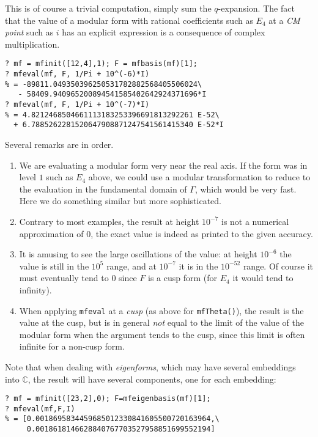 \documentclass[11pt]{article}
\newcommand{\C}{{\mathbb C}}
\newcommand{\G}{\Gamma}
\def\kbd#1{{\tt #1}}
\begin{document}
This is of course a trivial computation, simply sum the $q$-expansion. The
fact that the value of a modular form with rational coefficients such as
$E_4$ at a \emph{CM point} such as $i$ has an explicit expression is a
consequence of complex multiplication.

\begin{verbatim}
? mf = mfinit([12,4],1); F = mfbasis(mf)[1];
? mfeval(mf, F, 1/Pi + 10^(-6)*I)
% = -89811.049350396250531782882568405506024\
   - 58409.940965200894541585402642924371696*I
? mfeval(mf, F, 1/Pi + 10^(-7)*I)
% = 4.8212468504661113183253396691813292261 E-52\
  + 6.7885262281520647908871247541561415340 E-52*I
\end{verbatim}

Several remarks are in order.

\begin{enumerate}
\item We are evaluating a modular form very near the
  real axis. If the form was in level $1$ such as $E_4$ above, we could use a
  modular transformation to reduce to the evaluation in the fundamental domain
  of $\G$, which would be very fast. Here we do something similar but
  more sophisticated.
\item Contrary to most examples, the result at height $10^{-7}$ is not a
  numerical approximation of $0$, the exact value is indeed as printed to
  the given accuracy.
\item It is amusing to see the large oscillations of the value: at height
  $10^{-6}$ the value is still in the $10^5$ range, and at $10^{-7}$ it is
  in the $10^{-52}$ range. Of course it must eventually tend to $0$ since
  $F$ is a cusp form (for $E_4$ it would tend to infinity).
\item When applying \kbd{mfeval} at a \emph{cusp} (as above for
  \kbd{mfTheta()}), the result is
  the value at the cusp, but is in general \emph{not} equal
  to the limit of the value of the modular form when the argument tends to
  the cusp, since this limit is often infinite for a non-cusp form.
\end{enumerate}

Note that when dealing with \emph{eigenforms}, which may have several
embeddings into $\C$, the result will have several components, one for each
embedding:

\begin{verbatim}
? mf = mfinit([23,2],0); F=mfeigenbasis(mf)[1];
? mfeval(mf,F,I)
% = [0.0018695834459685012330841605500720163964,\
     0.0018618146628840767703527958851699552194]
\end{verbatim}
\end{document}
